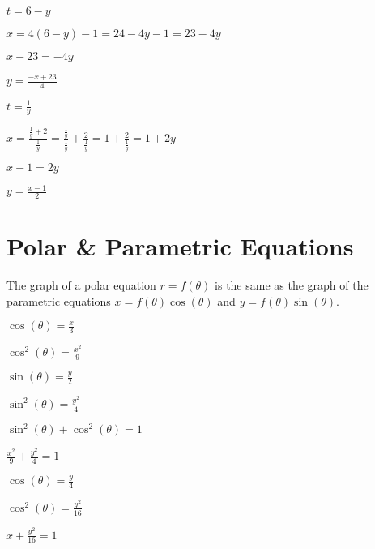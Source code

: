 \documentclass{report}
\begin{document}
$t=6-y$

$x=4(6-y)-1=24-4y-1=23-4y$

$x-23=-4y$

$\boxed{y=\frac{-x+23}{4}}$


$t=\frac{1}{y}$

$x=\frac{\frac{1}{y}+2}{\frac{1}{y}}=\frac{\frac{1}{y}}{\frac{1}{y}}+\frac{2}{\frac{1}{y}}=1+\frac{2}{\frac{1}{y}}=1+2y$

$x-1=2y$

$\boxed{y=\frac{x-1}{2}}$


\section{Polar \& Parametric Equations}

The graph of a polar equation $r=f(\theta)$ is the same as the graph of the parametric equations $x=f(\theta)\cos(\theta)$ and $y=f(\theta)\sin(\theta)$.


$\cos(\theta)=\frac{x}{3}$

$\cos^2(\theta)=\frac{x^2}{9}$

$\sin(\theta)=\frac{y}{2}$

$\sin^2(\theta)=\frac{y^2}{4}$

$\sin^2(\theta)+\cos^2(\theta)=1$

$\boxed{\frac{x^2}{9}+\frac{y^2}{4}=1}$


$\cos(\theta)=\frac{y}{4}$

$\cos^2(\theta)=\frac{y^2}{16}$

$\boxed{x+\frac{y^2}{16}=1}$
\end{document}
